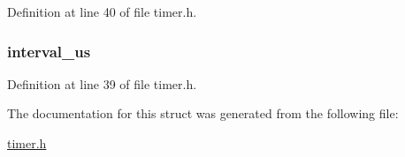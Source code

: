 \-Definition at line 40 of file timer.\-h.

\hypertarget{structtimer__channel_ae6870555100e4900dd024291aa59bc64}{
\subsubsection[{interval\-\_\-us}]{ {\bf interval\-\_\-us}}}\label{structtimer__channel_ae6870555100e4900dd024291aa59bc64}


\-Definition at line 39 of file timer.\-h.



\-The documentation for this struct was generated from the following file\-:\begin{DoxyCompactItemize}
\item 
\hyperlink{timer_8h}{timer.\-h}\end{DoxyCompactItemize}
